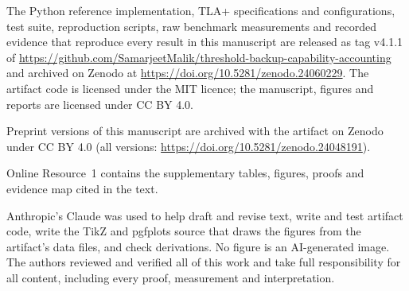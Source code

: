 \documentclass[pdflatex,sn-mathphys-num]{sn-jnl}%
\theoremstyle{plain}
\theoremstyle{definition}
\begin{document}
The Python reference implementation, TLA+ specifications and configurations, test suite, reproduction scripts, raw benchmark measurements and recorded evidence that reproduce every result in this manuscript are released as tag v4.1.1 of \url{https://github.com/SamarjeetMalik/threshold-backup-capability-accounting} and archived on Zenodo at \url{https://doi.org/10.5281/zenodo.24060229}. The artifact code is licensed under the MIT licence; the manuscript, figures and reports are licensed under CC BY 4.0.

Preprint versions of this manuscript are archived with the artifact on Zenodo under CC BY 4.0 (all versions: \url{https://doi.org/10.5281/zenodo.24048191}).

Online Resource~1 contains the supplementary tables, figures, proofs and evidence map cited in the text.

Anthropic's Claude was used to help draft and revise text, write and test artifact code, write the TikZ and pgfplots source that draws the figures from the artifact's data files, and check derivations. No figure is an AI-generated image. The authors reviewed and verified all of this work and take full responsibility for all content, including every proof, measurement and interpretation.




\end{document}
